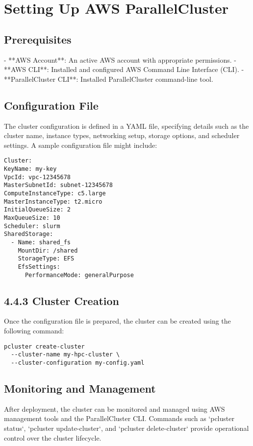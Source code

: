 \section{Setting Up AWS ParallelCluster}

\subsection{Prerequisites}

- **AWS Account**: An active AWS account with appropriate permissions.
- **AWS CLI**: Installed and configured AWS Command Line Interface (CLI).
- **ParallelCluster CLI**: Installed ParallelCluster command-line tool.

\subsection{Configuration File}

The cluster configuration is defined in a YAML file, specifying details such as the cluster name, instance types, networking setup, storage options, and scheduler settings. A sample configuration file might include:

\begin{verbatim}
Cluster:
KeyName: my-key
VpcId: vpc-12345678
MasterSubnetId: subnet-12345678
ComputeInstanceType: c5.large
MasterInstanceType: t2.micro
InitialQueueSize: 2
MaxQueueSize: 10
Scheduler: slurm
SharedStorage:
  - Name: shared_fs
    MountDir: /shared
    StorageType: EFS
    EfsSettings:
      PerformanceMode: generalPurpose
\end{verbatim}

\subsection{4.4.3 Cluster Creation}

Once the configuration file is prepared, the cluster can be created using the following command:

\begin{verbatim}
pcluster create-cluster 
  --cluster-name my-hpc-cluster \
  --cluster-configuration my-config.yaml
\end{verbatim}

\subsection{Monitoring and Management}

After deployment, the cluster can be monitored and managed using AWS management tools and the ParallelCluster CLI. Commands such as `pcluster status`, `pcluster update-cluster`, and `pcluster delete-cluster` provide operational control over the cluster lifecycle.

